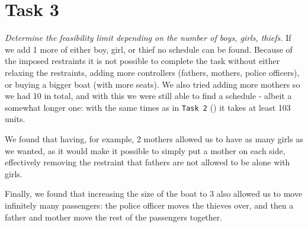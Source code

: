 \section{Task 3}
\label{sec:task3}
\textit{Determine the feasibility limit depending on the number of boys, girls, thiefs.}
If we add 1 more of either boy, girl, or thief no schedule can be found. Because of the imposed restraints it is not possible to complete the task without either relaxing the restraints, adding more controllers (fathers, mothers, police officers), or buying a bigger boat (with more seats). We also tried adding more mothers so we had 10 in total, and with this we were still able to find a schedule - albeit a somewhat longer one: with the same times as in \texttt{Task 2} () it takes at least 103 units.

We found that having, for example, 2 mothers allowed us to have as many girls as we wanted, as it would make it possible to simply put a mother on each side, effectively removing the restraint that fathers are not allowed to be alone with girls.

Finally, we found that increasing the size of the boat to 3 also allowed us to move infinitely many passengers: the police officer moves the thieves over, and then a father and mother move the rest of the passengers together.